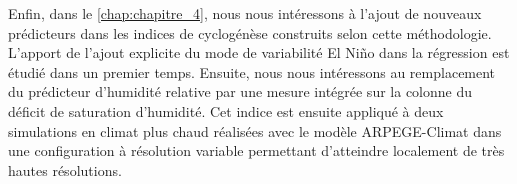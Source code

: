\documentclass[../main.tex]{subfiles}
\begin{document}
Enfin, dans le \cref{chap:chapitre_4}, nous nous intéressons à l'ajout de nouveaux prédicteurs dans les indices de cyclogénèse construits selon cette
méthodologie. L'apport de l'ajout explicite du mode de variabilité El Niño dans la régression est étudié dans un premier temps. Ensuite, nous nous intéressons
au remplacement du prédicteur d'humidité relative par une mesure intégrée sur la colonne du déficit de saturation d’humidité. Cet indice est ensuite appliqué à
deux simulations en climat plus chaud réalisées avec le modèle ARPEGE-Climat dans une configuration à résolution variable permettant d'atteindre localement de
très hautes résolutions.
\end{document}
